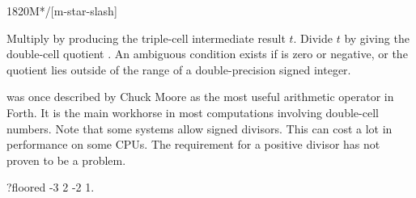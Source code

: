 \begin{worddef}{1820}{M*/}[m-star-slash]
\item {}

	Multiply  by  producing the triple-cell
	intermediate result $t$. Divide $t$ by  giving the
	double-cell quotient . An ambiguous condition exists
	if  is zero or negative, or the quotient lies outside
	of the range of a double-precision signed integer.

	\begin{rationale} %
		 was once described by Chuck Moore as the most
		useful arithmetic operator in Forth. It is the main workhorse
		in most computations involving double-cell numbers. Note that
		some systems allow signed divisors. This can cost a lot in
		performance on some CPUs. The requirement for a positive
		divisor has not proven to be a problem.
	\end{rationale}

	\begin{testing}\ttfamily
	\cbstart{}

		\word{:} ?floored \word{[} -3 2 \word{/} -2 \word{=} \word{]}   1.\   \word{;}

		\small 
		 \\
		 \\ %
		 \\ %
		 \\
		 \\
		 \\ %
		 \\


\end{testing}
\end{worddef}
